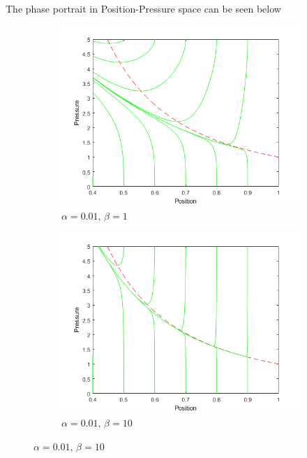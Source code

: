 The phase portrait in Position-Pressure space can be seen below

\begin{figure}[ht]
    \centering
    \begin{subfigure}{0.49\textwidth}
    \includegraphics[width=\textwidth]{Figures/LowFlow/PhasePortrait-b=1.png}
    \caption{$\alpha = 0.01, \, \beta = 1$}
    \end{subfigure}
    \begin{subfigure}{0.49\textwidth}
    \includegraphics[width=\textwidth]{Figures/LowFlow/PhasePortrait-b=10.png}
    \caption{$\alpha = 0.01, \, \beta = 10$}
    \end{subfigure}
\end{figure}